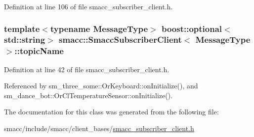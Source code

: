 Definition at line 106 of file smacc\+\_\+subscriber\+\_\+client.\+h.

\subsubsection[{\texorpdfstring{topic\+Name}{topicName}}]{\setlength{\rightskip}{0pt plus 5cm}template$<$typename Message\+Type$>$ boost\+::optional$<$std\+::string$>$ {\bf smacc\+::\+Smacc\+Subscriber\+Client}$<$ Message\+Type $>$\+::topic\+Name}\hypertarget{classsmacc_1_1SmaccSubscriberClient_ac062907e834aa8e4ca7964fe2035edf7}{}\label{classsmacc_1_1SmaccSubscriberClient_ac062907e834aa8e4ca7964fe2035edf7}


Definition at line 42 of file smacc\+\_\+subscriber\+\_\+client.\+h.



Referenced by sm\+\_\+three\+\_\+some\+::\+Or\+Keyboard\+::on\+Initialize(), and sm\+\_\+dance\+\_\+bot\+::\+Or\+Cl\+Temperature\+Sensor\+::on\+Initialize().



The documentation for this class was generated from the following file\+:\begin{DoxyCompactItemize}
\item 
smacc/include/smacc/client\+\_\+bases/\hyperlink{smacc__subscriber__client_8h}{smacc\+\_\+subscriber\+\_\+client.\+h}\end{DoxyCompactItemize}
